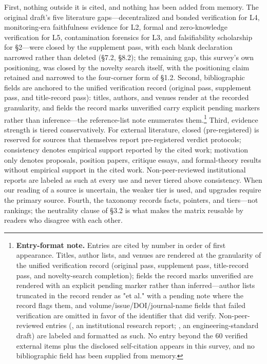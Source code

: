 \documentclass[11pt,a4paper]{article}
\begin{document}
First, nothing outside it is cited, and nothing has been added from memory. The original draft's five literature gaps—decentralized and bonded verification for L4, monitoring-era faithfulness evidence for L2, formal and zero-knowledge verification for L5, contamination forensics for L3, and falsifiability scholarship for §2—were closed by the supplement pass, with each blank declaration narrowed rather than deleted (§7.2, §8.2); the remaining gap, this survey's own positioning, was closed by the novelty search itself, with the positioning claim retained and narrowed to the four-corner form of §1.2. Second, bibliographic fields are anchored to the unified verification record (original pass, supplement pass, and title-record pass): titles, authors, and venues render at the recorded granularity, and fields the record marks unverified carry explicit pending markers rather than inference—the reference-list note enumerates them.\footnote{\textbf{Entry-format note.} Entries are cited by number in order of first appearance. Titles, author lists, and venues are rendered at the granularity of the unified verification record (original pass, supplement pass, title-record pass, and novelty-search completion); fields the record marks unverified are rendered with an explicit pending marker rather than inferred—author lists truncated in the record render as "et al." with a pending note where the record flags them, and volume/issue/DOI/journal-name fields that failed verification are omitted in favor of the identifier that did verify. Non-peer-reviewed entries (\cite{key31}, an institutional research report; \cite{key51}, an engineering-standard draft) are labeled and formatted as such. No entry beyond the 60 verified external items plus the disclosed self-citation \cite{key04} appears in this survey, and no bibliographic field has been supplied from memory.} Third, evidence strength is tiered conservatively. For external literature, closed (pre-registered) is reserved for sources that themselves report pre-registered verdict protocols; consistency denotes empirical support reported by the cited work; motivation only denotes proposals, position papers, critique essays, and formal-theory results without empirical support in the cited work. Non-peer-reviewed institutional reports are labeled as such at every use and never tiered above consistency. When our reading of a source is uncertain, the weaker tier is used, and upgrades require the primary source. Fourth, the taxonomy records facts, pointers, and tiers—not rankings; the neutrality clause of §3.2 is what makes the matrix reusable by readers who disagree with each other.
\end{document}
